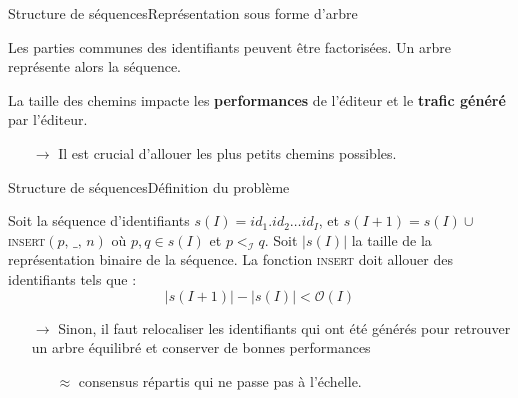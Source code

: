 \begin{frame}{Structure de séquences}{Représentation sous forme d'arbre}

  \begin{center}
    
  \end{center}
  
  \vspace{0.15cm}
  
  \begin{minipage}{0.45\textwidth}
    Les parties communes des identifiants peuvent être factorisées. Un arbre
    représente alors la séquence.

    \vspace{0.2cm}

    La taille des chemins impacte les \textbf{performances} de l'éditeur et le
    \textbf{trafic généré} par l'éditeur.
    \begin{itemize}
    \item [$\rightarrow$] Il est crucial d'allouer les plus petits chemins
      possibles.
    \end{itemize}
  \end{minipage}
  \hfill
  \begin{minipage}{0.45\textwidth}
    \begin{center}
      
    \end{center}
  \end{minipage}

\end{frame}



\begin{frame}{Structure de séquences}{Définition du problème}

  \begin{problem}
    Soit la séquence d'identifiants $s(I)= id_1.id_2\ldots id_I$, et
    $s(I+1) = s(I) \cup $\textsc{insert}$(p,\, \_,\, n)$ où $p,q \in s(I)$ et
    $p<_\mathcal{I}q$. Soit $|s(I)|$ la taille de la représentation binaire de la
    séquence. La fonction \textsc{insert} doit allouer des identifiants tels que :
    \begin{equation}
      |s(I+1)| - |s(I)| < \mathcal{O}(I)
    \end{equation}
  \end{problem}
  
  \vspace{0.5cm}

  \begin{itemize}
  \item [$\rightarrow$] Sinon, il faut relocaliser les identifiants qui ont été
    générés pour retrouver un arbre équilibré et conserver de bonnes performances
    \begin{itemize}
    \item [$\approx$] consensus répartis qui ne passe pas à l'échelle.
    \end{itemize}
  \end{itemize}

\end{frame}


